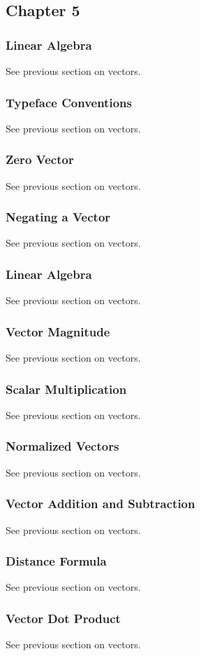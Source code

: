 \documentclass[a4paper,11pt]{amsart}
\begin{document}
\subsection{Chapter 5}

\subsubsection{Linear Algebra}
See previous section on vectors.
\subsubsection{Typeface Conventions}
See previous section on vectors.
\subsubsection{Zero Vector}
See previous section on vectors.
\subsubsection{Negating a Vector}
See previous section on vectors.
\subsubsection{Linear Algebra}
See previous section on vectors.
\subsubsection{Vector Magnitude}
See previous section on vectors.
\subsubsection{Scalar Multiplication}
See previous section on vectors.
\subsubsection{Normalized Vectors}
See previous section on vectors.
\subsubsection{Vector Addition and Subtraction}
See previous section on vectors.
\subsubsection{Distance Formula}
See previous section on vectors.
\subsubsection{Vector Dot Product}
See previous section on vectors.
\end{document}
